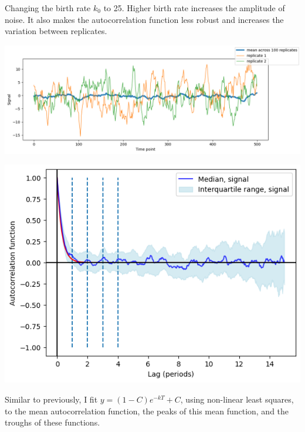 \begin{enumerate}
\begin{enumerate}
\begin{enumerate}
Changing the birth rate \(k_{0}\) to 25.  Higher birth rate increases the amplitude of noise.   It also makes the autocorrelation function less robust and increases the variation between replicates.
\begin{center}
\includegraphics[width=.9\linewidth]{gillespie_k25_d0p05_mean.png}
\end{center}
\begin{center}
\includegraphics[width=.9\linewidth]{gillespie_k25_d0p05_acf.png}
\end{center}

Similar to previously, I fit \(y = (1-C)e^{-kT}+C\), using non-linear least squares, to the mean autocorrelation function, the peaks of this mean function, and the troughs of these functions.


\end{enumerate}
\end{enumerate}
\end{enumerate}
